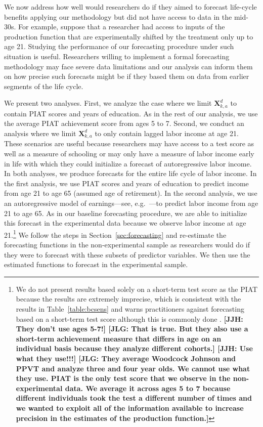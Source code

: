 We now address how well would researchers do if they aimed to forecast life-cycle benefits applying our methodology but did not have access to data in the mid-30s. For example, suppose that a researcher had access to inputs of the production function that are experimentally shifted by the treatment only up to age 21. Studying the performance of our forecasting procedure under such situation is useful. Researchers willing to implement a formal forecasting methodology may face severe data limitations and our analysis can inform them on how precise such forecasts might be if they based them on data from earlier segments of the life cycle.

We present two analyses. First, we analyze the case where we limit $\bm{X}_{k,a}^d$ to contain PIAT scores and years of education. As in the rest of our analysis, we use the average PIAT achievement score from ages 5 to 7. Second, we conduct an analysis where we limit $\bm{X}_{k,a}^d$ to only contain lagged labor income at age 21. These scenarios are useful because researchers may have access to a test score as well as a measure of schooling or may only have a measure of labor income early in life with which they could initialize a forecast of autoregressive labor income. In both analyses, we produce forecasts for the entire life cycle of labor income. In the first analysis, we use PIAT scores and years of education to predict income from age 21 to age 65 (assumed age of retirement). In the second analysis, we use an autoregressive model of earnings---see, e.g.\ \citet{Meghir_Pistaferri_2011_HLE}---to predict labor income from age 21 to age 65. As in our baseline forecasting procedure, we are able to initialize this forecast in the experimental data because we observe labor income at age 21.\footnote{We do not present results based solely on a short-term test score as the PIAT because the results are extremely imprecise, which is consistent with the results in Table~\ref{table:bcsens} and warns practitioners against forecasting based on a short-term test score although this is commonly done \citep[e.g.][]{Kline_Walters_2016_QJE}. \textbf{[JJH: They don't use ages 5-7!] [JLG: That is true. But they also use a short-term achievement measure that differs in age on an individual basis because they analyze different cohorts.] [JJH: Use what they use!!!] [JLG: They average Woodcock Johnson and PPVT and analyze three and four year olds. We cannot use what they use. PIAT is the only test score that we observe in the non-experimental data. We average it across ages 5 to 7 because different individuals took the test a different number of times and we wanted to exploit all of the information available to increase precision in the estimates of the production function.]}} We follow the steps in Section~\ref{sec:forecasting} and re-estimate the forecasting functions in the non-experimental sample as researchers would do if they were to forecast with these subsets of predictor variables. We then use the estimated functions to forecast in the experimental sample. 

